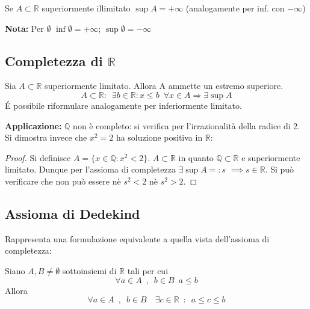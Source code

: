 \documentclass[10pt]{article}
\theoremstyle{plain}
\begin{document}
\begin{defin}
    Se $A \subset \mathbb{R}$ superiormente illimitato $\sup A = + \infty$ (analogamente per inf. con $- \infty$)
\end{defin}
\textbf{Nota: } Per $\emptyset$ $\inf \emptyset = + \infty$; $\sup \emptyset = - \infty$

\subsection{Completezza di \texorpdfstring{$\mathbb{R}$}{$\mathbb{R}$}}
\begin{ass}
Sia $A \subset \mathbb{R}$ superiormente limitato. Allora A ammette un estremo superiore.
\[A \subset \mathbb{R} : \enspace \exists b \in \mathbb{R}: x \leq b \enspace \forall x \in A \Longrightarrow \exists \sup A\]
\'E possibile riformulare analogamente per inferiormente limitato.
\end{ass}
\textbf{Applicazione: } $\mathbb{Q}$ non è completo: si verifica per l'irrazionalità della radice di 2. Si dimostra invece che $x^2 = 2$ ha soluzione positiva in $\mathbb{R}$:
\begin{proof}
    Si definisce $A = \{x \in \mathbb{Q} : x^2 < 2\}$. $A \subset \mathbb{R}$ in quanto $\mathbb{Q} \subset \mathbb{R}$ e superiormente limitato. Dunque per l'assioma di completezza $\exists \sup A =: s$ $\implies s \in \mathbb{R}$. Si può verificare che non può essere nè $s^2 < 2$ nè $s^2 > 2$.
\end{proof}

\subsection{Assioma di Dedekind}
Rappresenta una formulazione equivalente a quella vista dell'assioma di completezza:
\begin{ass}
    Siano $A, B \neq \emptyset$ sottoinsiemi di $\mathbb{R}$ tali per cui 
    \[\forall a \in A \enspace, \enspace b \in B \enspace a \leq b\]
    Allora
    \[\forall a \in A\enspace, \enspace b \in B \quad \exists c \in \mathbb{R} \enspace : \enspace a \leq c \leq b\]
\end{ass}
\end{document}
